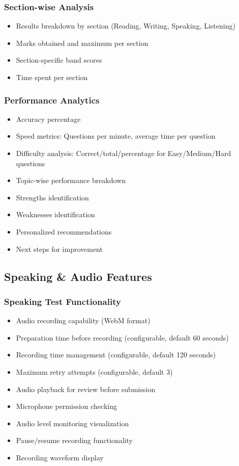 \documentclass{article}
\begin{document}
\subsubsection{Section-wise Analysis}
\begin{itemize}
    \item Results breakdown by section (Reading, Writing, Speaking, Listening)
    \item Marks obtained and maximum per section
    \item Section-specific band scores
    \item Time spent per section
\end{itemize}

\subsubsection{Performance Analytics}
\begin{itemize}
    \item Accuracy percentage
    \item Speed metrics: Questions per minute, average time per question
    \item Difficulty analysis: Correct/total/percentage for Easy/Medium/Hard questions
    \item Topic-wise performance breakdown
    \item Strengths identification
    \item Weaknesses identification
    \item Personalized recommendations
    \item Next steps for improvement
\end{itemize}

\subsection{Speaking \& Audio Features}

\subsubsection{Speaking Test Functionality}
\begin{itemize}
    \item Audio recording capability (WebM format)
    \item Preparation time before recording (configurable, default 60 seconds)
    \item Recording time management (configurable, default 120 seconds)
    \item Maximum retry attempts (configurable, default 3)
    \item Audio playback for review before submission
    \item Microphone permission checking
    \item Audio level monitoring visualization
    \item Pause/resume recording functionality
    \item Recording waveform display
\end{itemize}
\end{document}
